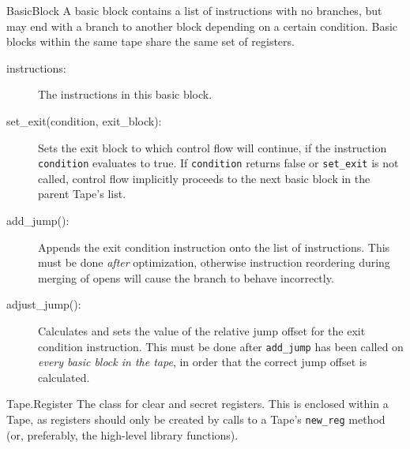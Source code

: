 \begin{class}{BasicBlock}
A basic block contains a list of instructions with no branches, but may
end with a branch to another block depending on a certain condition. Basic
blocks within the same tape share the same set of registers.
\begin{description}
\item[instructions:] The instructions in this basic block.
\item[set_exit(condition, exit_block):] Sets the exit block to which control
flow will continue, if the instruction \verb|condition| evaluates to true.
If \verb|condition| returns false
or \verb|set_exit| is not called, control flow implicitly
proceeds to the next basic block in the parent Tape's list.
\item[add_jump():] Appends the exit condition instruction onto the list of
instructions. This must be done \emph{after} optimization, otherwise instruction
reordering during merging of opens will cause the branch to behave incorrectly.
\item[adjust_jump():] Calculates and sets the value of the relative jump
offset for the exit
condition instruction. This must be done after \verb|add_jump| has been called
on \emph{every basic block in the tape}, in order that the correct jump offset
is calculated.
\end{description}
\end{class}

\begin{class}{Tape.Register}
The class for clear and secret registers. This is enclosed within a Tape, as
registers should only be created by calls to a Tape's \verb|new_reg| method
(or, preferably, the high-level library functions).
\end{class}

